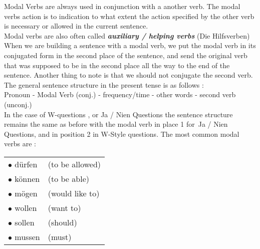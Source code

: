 \documentclass[a4paper,twocolumn,10pt]{article}
\begin{document}
\justifying
\linenumbers


Modal Verbs are always used in conjunction with a another verb. The modal verbs
action is to indication to what extent the action specified by the other verb is
necessary or allowed in the current sentence.\\

Modal verbs are also often called \textbf{\textit{auxiliary / helping verbs}}
(Die Hilfsverben)\\

When we are building a sentence with a modal verb, we put the modal verb in its
conjugated form in the second place of the sentence, and send the original verb
that was supposed to be in the second place all the way to the end of the
sentence. Another thing to note is that we should not conjugate the second
verb.\\

The general sentence structure in the present tense is as follows :\\

Pronoun - Modal Verb (conj.) - frequency/time - other words - second verb
(unconj.)\\

In the case of W-questions , or Ja / Nien Questions the sentence structure
remains the same as before with the modal verb in place 1 for Ja / Nien
Questions, and in position 2 in W-Style questions. The most common modal verbs
are :


\vspace{0.3cm}
\begin{tabular}{l l}

\rowcolor{white} $\bullet$ dürfen & (to be allowed)  \\
\rowcolor{white} $\bullet$ können & (to be able)  \\
\rowcolor{white} $\bullet$ mögen & (would like to)  \\ 
\rowcolor{white} $\bullet$ wollen & (want to)  \\
\rowcolor{white} $\bullet$ sollen & (should)\\
\rowcolor{white} $\bullet$ mussen & (must) \\

\end{tabular}
\vspace{0.3cm}
\newline
\end{document}
